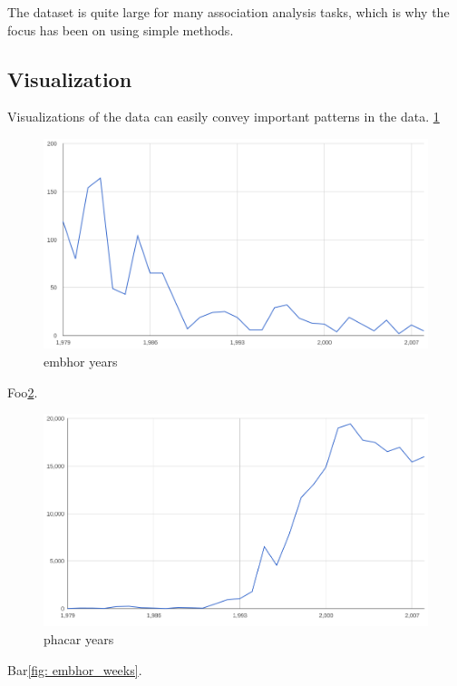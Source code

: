 \documentclass[english]{tktltiki2}
\begin{document}
The dataset is quite large for many association analysis tasks, which is why the focus has been on using simple methods.


\subsection{Visualization}

Visualizations of the data can easily convey important patterns in the data. \ref{fig: embhor_years}

\begin{figure}[htb]
\centering
\includegraphics[clip=true, width=\textwidth]{embhor_years}
\caption{embhor years}
\label{fig: embhor_years}
\end{figure}

Foo\ref{fig: phacar_years}.

\begin{figure}[htb]
\centering
\includegraphics[clip=true, width=\textwidth]{phacar_years}
\caption{phacar years}
\label{fig: phacar_years}
\end{figure}

Bar\ref{fig: embhor_weeks}.
\end{document}

